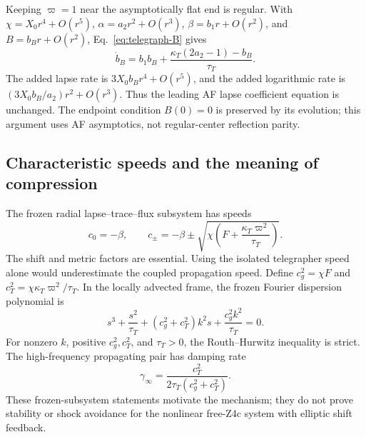 Keeping $\varpi=1$ near the asymptotically flat end is regular. With $\chi=X_0r^4+O(r^5)$, $\alpha=a_2r^2+O(r^3)$, $\beta=b_1r+O(r^2)$, and $B=b_Br+O(r^2)$, Eq.~\eqref{eq:telegraph-B} gives
\begin{equation}
 \dot b_B=b_1b_B+\frac{\kappa_T(2a_2-1)-b_B}{\tau_T}.
\end{equation}
The added lapse rate is $3X_0b_Br^4+O(r^5)$, and the added logarithmic rate is $(3X_0b_B/a_2)r^2+O(r^3)$. Thus the leading AF lapse coefficient equation is unchanged. The endpoint condition $B(0)=0$ is preserved by its evolution; this argument uses AF asymptotics, not regular-center reflection parity.

\subsection{Characteristic speeds and the meaning of compression}
The frozen radial lapse--trace--flux subsystem has speeds
\begin{equation}
 c_0=-\beta,\qquad
 c_\pm=-\beta\pm\sqrt{\chi\left(F+\frac{\kappa_T\varpi^2}{\tau_T}\right)}.
\label{eq:telegraph-speeds}
\end{equation}
The shift and metric factors are essential. Using the isolated telegrapher speed alone would underestimate the coupled propagation speed. Define $c_g^2=\chi F$ and $c_T^2=\chi\kappa_T\varpi^2/\tau_T$. In the locally advected frame, the frozen Fourier dispersion polynomial is
\begin{equation}
 s^3+\frac{s^2}{\tau_T}+(c_g^2+c_T^2)k^2s
 +\frac{c_g^2k^2}{\tau_T}=0.
\label{eq:telegraph-dispersion}
\end{equation}
For nonzero $k$, positive $c_g^2,c_T^2$, and $\tau_T>0$, the Routh--Hurwitz inequality is strict. The high-frequency propagating pair has damping rate
\begin{equation}
 \gamma_\infty=\frac{c_T^2}{2\tau_T(c_g^2+c_T^2)}.
\end{equation}
These frozen-subsystem statements motivate the mechanism; they do not prove stability or shock avoidance for the nonlinear free-Z4c system with elliptic shift feedback.

